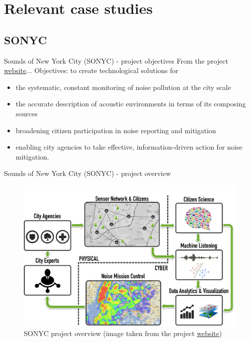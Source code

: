 \documentclass{beamer}
\newcommand{\myhref}[2]{{\color{blue}\href{#1}{#2}}}
\begin{document}
\section{Relevant case studies}
    
    \subsection{SONYC}
        
    \begin{frame}{Sounds of New York City (SONYC) - project objectives}
        From the project \myhref{https://wp.nyu.edu/sonyc}{website}...
        \vfill 
        Objectives: to create technological solutions for
        \begin{itemize}
            \item the systematic, constant monitoring of noise pollution at the city scale
            \item the accurate description of acoustic environments in terms of its composing sources
            \item broadening citizen participation in noise reporting and mitigation
            \item enabling city agencies to take effective, information-driven action for noise mitigation.
        \end{itemize}
    \end{frame}  
    
    \begin{frame}{Sounds of New York City (SONYC) - project overview}
        \begin{center}
            \begin{figure}
                \includegraphics[scale=0.4]{figures/sonyc.png}
                \caption{SONYC project overview (image taken from the project \myhref{https://wp.nyu.edu/sonyc}{website})}
            \end{figure}
        \end{center}
    \end{frame}
    
\end{document}
